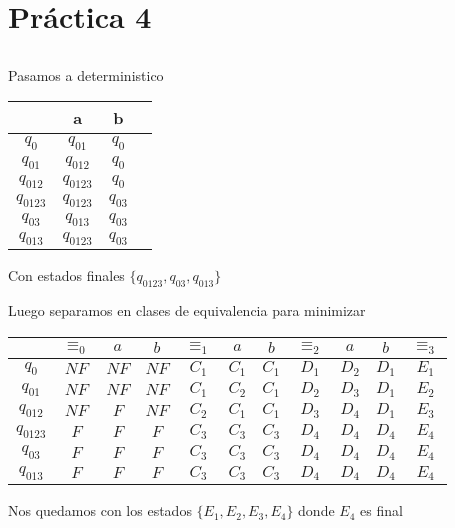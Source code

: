 \setcounter{section}{3}
\section{Práctica 4}
\subsection{}
\subsubsection{}
Pasamos a deterministico

\begin{tabular}{c | c | c | c}
			& a 			& b  	\\
\hline
$q_0$ 		& $q_{01}$ 		& $q_0$ 	\\
$q_{01}$ 	& $q_{012}$		& $q_0$ 	\\
$q_{012}$ 	& $q_{0123}$ 	& $q_0$ 	\\
$q_{0123}$ 	& $q_{0123}$ 	& $q_{03}$ 	\\
$q_{03}$ 	& $q_{013}$ 	& $q_{03}$ 	\\
$q_{013}$ 	& $q_{0123}$ 	& $q_{03}$ 	\\
\end{tabular}

Con estados finales $\{q_{0123},q_{03},q_{013}\}$

Luego separamos en clases de equivalencia para minimizar

\begin{tabular}{| c || c | c | c || c | c | c || c | c | c || c |}
\hline
			& $\equiv_0$	& $a$	& $b$	& $\equiv_1$	& $a$	& $b$	& $\equiv_2$	& $a$	& $b$	& $\equiv_3$ \\
\hline			
$q_0$		& $NF$			& $NF$	& $NF$ 	& $C_1$			& $C_1$ & $C_1$ & $D_1$			& $D_2$ & $D_1$ & $E_1$ \\
\hline
$q_{01}$ 	& $NF$			& $NF$	& $NF$ 	& $C_1$ 		& $C_2$ & $C_1$ & $D_2$			& $D_3$ & $D_1$ & $E_2$ \\
\hline
$q_{012}$ 	& $NF$ 			& $F$	& $NF$ 	& $C_2$ 		& $C_1$ & $C_1$ & $D_3$			& $D_4$ & $D_1$ & $E_3$ \\
\hline
$q_{0123}$ 	& $F$ 			& $F$	& $F$ 	& $C_3$ 		& $C_3$ & $C_3$ & $D_4$			& $D_4$ & $D_4$ & $E_4$ \\
\hline
$q_{03}$ 	& $F$ 			& $F$	& $F$ 	& $C_3$ 		& $C_3$ & $C_3$ & $D_4$			& $D_4$ & $D_4$ & $E_4$ \\
\hline
$q_{013}$ 	& $F$ 			& $F$	& $F$ 	& $C_3$ 		& $C_3$ & $C_3$ & $D_4$			& $D_4$ & $D_4$ & $E_4$ \\
\hline
\end{tabular}

Nos quedamos con los estados $\{E_1,E_2,E_3,E_4\}$ donde $E_4$ es final